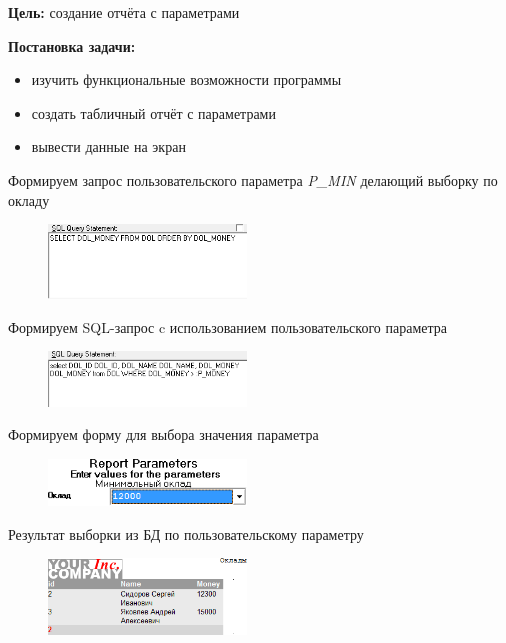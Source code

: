 \documentclass[pscyr, 12pt]{hedlab}
\begin{document}
    \makeheader
    \noindent\textbf{Цель:} создание отчёта с параметрами

    \noindent\textbf{Постановка задачи:}\vspace*{-0.5em}
    \begin{itemize}\itemsep-5pt
        \item изучить функциональные возможности программы
        \item создать табличный отчёт с параметрами
        \item вывести данные на экран
    \end{itemize}

    Формируем запрос пользовательского параметра \emph{P\_MIN} делающий выборку по окладу
    \begin{figure}[ht!]
        \center
        \includegraphics[width=0.47\textwidth]{lab07_01}
    \end{figure}

    Формируем SQL-запрос c использованием пользовательского параметра 
    \begin{figure}[ht!]
        \center
        \includegraphics[width=0.47\textwidth]{lab07_02}
    \end{figure}

    Формируем форму для выбора значения параметра
    \begin{figure}[ht!]
        \center
        \includegraphics[width=0.47\textwidth]{lab07_03}
    \end{figure}

    Результат выборки из БД по пользовательскому параметру
    \begin{figure}[ht!]
        \center
        \includegraphics[width=0.47\textwidth]{lab07_04}
    \end{figure}
\end{document}
